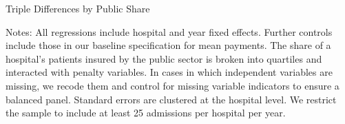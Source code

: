 \documentclass[12pt]{article}
\begin{document}
\newpage
{}
\setlength{\captionmargin}{.5 \textwidth} \addtolength{\captionmargin}{-.5\wd\gfxbox}
\begin{table}[htbp!]
\centering
\caption{Triple Differences by Public Share}
\label{tab:publicshare}
\usebox{\gfxbox}
\par
\begin{minipage}{\wd\gfxbox}
\footnotesize
Notes: All regressions include hospital and year fixed effects.  Further controls include those in our baseline specification for mean payments.  The share of a hospital's patients insured by the public sector is broken into quartiles and interacted with penalty variables.  In cases in which independent variables are missing, we recode them and control for missing variable indicators to ensure a balanced panel.  Standard errors are clustered at the hospital level.  We restrict the sample to include at least 25 admissions per hospital per year.
\end{minipage}
\end{table}
\end{document}
